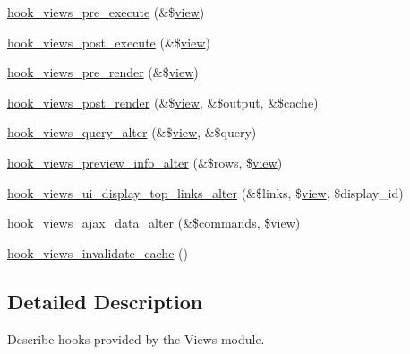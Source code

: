\begin{DoxyCompactItemize}
\item 
\hyperlink{group__views__hooks_gaf7582b210bdd367d6006c7dc62304475}{hook\_\-views\_\-pre\_\-execute} (\&\$\hyperlink{classview}{view})
\item 
\hyperlink{group__views__hooks_ga52e5f67061bf3a8cb9f8bf208d9a1357}{hook\_\-views\_\-post\_\-execute} (\&\$\hyperlink{classview}{view})
\item 
\hyperlink{group__views__hooks_gab88d5c49ec4ad30dba2be34327d5b0cc}{hook\_\-views\_\-pre\_\-render} (\&\$\hyperlink{classview}{view})
\item 
\hyperlink{group__views__hooks_ga21cc61642e5cafc23ec621f07dae1f4b}{hook\_\-views\_\-post\_\-render} (\&\$\hyperlink{classview}{view}, \&\$output, \&\$cache)
\item 
\hyperlink{group__views__hooks_gaf4d538493930fe0fa0ce6fb3bf42c156}{hook\_\-views\_\-query\_\-alter} (\&\$\hyperlink{classview}{view}, \&\$query)
\item 
\hyperlink{group__views__hooks_gafeafa28dd3e140b2d4f8cfdfc7d76922}{hook\_\-views\_\-preview\_\-info\_\-alter} (\&\$rows, \$\hyperlink{classview}{view})
\item 
\hyperlink{group__views__hooks_ga376184982a8ac07a1da0708b4975b6be}{hook\_\-views\_\-ui\_\-display\_\-top\_\-links\_\-alter} (\&\$links, \$\hyperlink{classview}{view}, \$display\_\-id)
\item 
\hyperlink{group__views__hooks_gac5c4edbedfa01ac99618dfa7bbc4e6a2}{hook\_\-views\_\-ajax\_\-data\_\-alter} (\&\$commands, \$\hyperlink{classview}{view})
\item 
\hyperlink{group__views__hooks_ga4d3be7a9646f70c9a5d321931135dd84}{hook\_\-views\_\-invalidate\_\-cache} ()
\end{DoxyCompactItemize}


\subsection{Detailed Description}
Describe hooks provided by the Views module. 